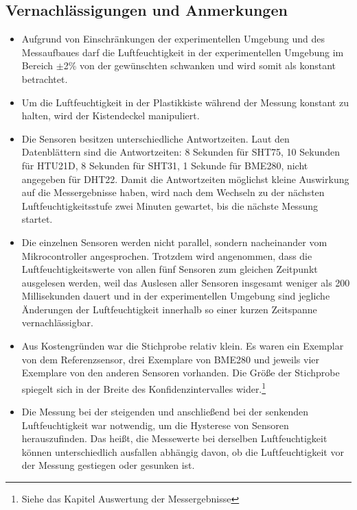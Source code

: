 \documentclass[runningheads]{llncs}
\begin{document}
\subsection{Vernachlässigungen und Anmerkungen}
\begin{itemize}
\item Aufgrund von Einschränkungen der experimentellen Umgebung und des Messaufbaues darf die Luftfeuchtigkeit in der experimentellen Umgebung im Bereich $\pm$2\% von der gewünschten schwanken und wird somit als konstant betrachtet.
\end{itemize}
\begin{itemize}
\item Um die Luftfeuchtigkeit in der Plastikkiste während der Messung konstant zu halten, wird der Kistendeckel manipuliert.
\end{itemize}
\begin{itemize}
\item Die Sensoren besitzen unterschiedliche Antwortzeiten. Laut den Datenblättern sind die Antwortzeiten: 8 Sekunden für SHT75, 10 Sekunden für HTU21D, 8 Sekunden für SHT31, 1 Sekunde für BME280, nicht angegeben für DHT22. Damit die Antwortzeiten möglichst kleine  Auswirkung auf die Messergebnisse haben, wird nach dem Wechseln zu der nächsten Luftfeuchtigkeitsstufe zwei Minuten gewartet, bis die nächste Messung startet.
\end{itemize}
\begin{itemize}
\item Die einzelnen Sensoren werden nicht parallel, sondern nacheinander vom Mikrocontroller angesprochen. Trotzdem wird angenommen, dass die Luftfeuchtigkeitswerte von allen fünf Sensoren zum gleichen Zeitpunkt ausgelesen werden, weil das Auslesen aller Sensoren insgesamt weniger als 200 Millisekunden dauert und in der experimentellen Umgebung sind jegliche Änderungen der Luftfeuchtigkeit innerhalb so einer kurzen Zeitspanne vernachlässigbar.
\end{itemize}
\begin{itemize}
\item Aus Kostengründen war die Stichprobe relativ klein. Es waren ein Exemplar von dem Referenzsensor, drei Exemplare von BME280 und jeweils vier Exemplare von den anderen Sensoren vorhanden. Die Größe der Stichprobe spiegelt sich in der Breite des Konfidenzintervalles wider.\footnote[1]{Siehe das Kapitel Auswertung der Messergebnisse}
\end{itemize}
\begin{itemize}
\item Die Messung bei der steigenden und anschließend bei der senkenden Luftfeuchtigkeit war notwendig, um die Hysterese von Sensoren herauszufinden. Das heißt, die Messewerte bei derselben  Luftfeuchtigkeit können unterschiedlich ausfallen abhängig davon, ob die Luftfeuchtigkeit vor der Messung gestiegen oder gesunken ist.     
\end{itemize}
\end{document}

